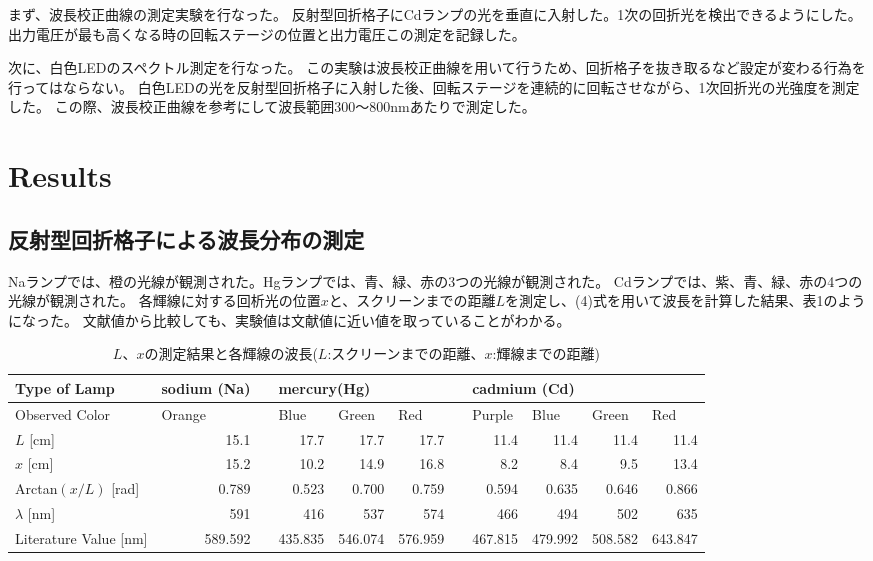 \documentclass[a4paper,10pt]{jsarticle}
\begin{document}
\begin{multicols}{2}
まず、波長校正曲線の測定実験を行なった。
反射型回折格子にCdランプの光を垂直に入射した。1次の回折光を検出できるようにした。出力電圧が最も高くなる時の回転ステージの位置と出力電圧この測定を記録した。

次に、白色LEDのスペクトル測定を行なった。
この実験は波長校正曲線を用いて行うため、回折格子を抜き取るなど設定が変わる行為を行ってはならない。
白色LEDの光を反射型回折格子に入射した後、回転ステージを連続的に回転させながら、1次回折光の光強度を測定した。
この際、波長校正曲線を参考にして波長範囲300〜800nmあたりで測定した。

\section{Results}

\subsection{反射型回折格子による波長分布の測定}
Naランプでは、橙の光線が観測された。Hgランプでは、青、緑、赤の3つの光線が観測された。
Cdランプでは、紫、青、緑、赤の4つの光線が観測された。
各輝線に対する回析光の位置$x$と、スクリーンまでの距離$L$を測定し、(4)式を用いて波長を計算した結果、表1のようになった。
文献値から比較しても、実験値は文献値に近い値を取っていることがわかる。
\begin{table}[htbp]  
  \centering
  \caption{$L$、$x$の測定結果と各輝線の波長($L$:スクリーンまでの距離、$x$:輝線までの距離)}
    \begin{tabular}{lrrrrrrrrrr}
    \toprule
    Type of Lamp & \multicolumn{1}{l}{sodium (Na)} &       & \multicolumn{3}{l}{mercury(Hg)} &       & \multicolumn{4}{l}{cadmium (Cd)} \\
    \midrule
    Observed Color & \multicolumn{1}{l}{Orange} &       & \multicolumn{1}{l}{Blue} & \multicolumn{1}{l}{Green} & \multicolumn{1}{l}{Red} &       & \multicolumn{1}{l}{Purple} & \multicolumn{1}{l}{Blue} & \multicolumn{1}{l}{Green} & \multicolumn{1}{l}{Red} \\
    $L$ [cm] & 15.1  &       & 17.7  & 17.7  & 17.7  &       & 11.4  & 11.4  & 11.4  & 11.4 \\
    $x$ [cm] & 15.2  &       & 10.2  & 14.9  & 16.8  &       & 8.2   & 8.4   & 9.5   & 13.4 \\
    Arctan$(x/L)$ [rad] & 0.789 &       & 0.523 & 0.700 & 0.759 &       & 0.594 & 0.635 & 0.646 & 0.866 \\
    $\lambda$ [nm] & 591   &       & 416   & 537   & 574   &       & 466   & 494   & 502   & 635 \\
    Literature Value [nm] & 589.592 &       & 435.835 & 546.074 & 576.959 &       & 467.815 & 479.992 & 508.582 & 643.847 \\
    \bottomrule
    \end{tabular}%
  \label{tab:addlabel}%
\end{table}%


\end{multicols}
\end{document}
